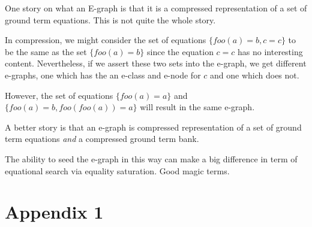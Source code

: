 
One story on what an E-graph is that it is a compressed representation of a set of ground term equations. This is not quite the whole story. 

In compression, we might consider the set of equations $\{foo(a) = b, c = c\}$ to be the same as the set $\{foo(a) = b\}$ since the equation $c = c$ has no interesting content. Nevertheless, if we assert these two sets into the e-graph, we get different e-graphs, one which has the an e-class and e-node for $c$ and one which does not.

However, the set of equations $\{foo(a) = a\}$ and $\{foo(a) = b, foo(foo(a)) = a\}$ will result in the same e-graph.  

A better story is that an e-graph is compressed representation of a set of ground term equations \textit{and} a compressed ground term bank. 

The ability to seed the e-graph in this way can make a big difference in term of equational search via equality saturation. Good magic terms.










\appendix

\section{Appendix 1}


